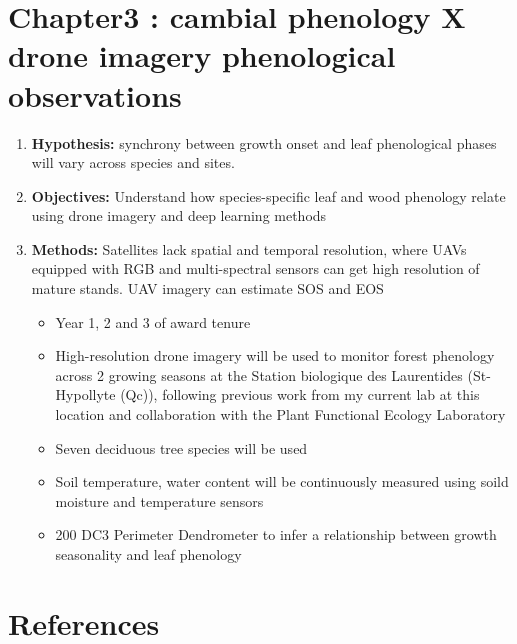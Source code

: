 \documentclass{article}
\begin{document}
\section*{Chapter3 : cambial phenology X drone imagery phenological observations}
\begin {enumerate}
	\item \textbf{Hypothesis:} synchrony between growth onset and leaf phenological phases will vary across species and sites.
	\item \textbf{Objectives:} Understand how species-specific leaf and wood phenology relate using drone imagery and deep learning methods  
	\item \textbf{Methods:} Satellites lack spatial and temporal resolution, where UAVs equipped with RGB and multi-spectral sensors can get high resolution of mature stands. UAV imagery can estimate SOS and EOS \citep{berra_assessing_2019,fawcett_monitoring_2021}
		\begin{itemize}
			\item Year 1, 2 and 3 of award tenure
			\item High-resolution drone imagery will be used to monitor forest phenology across 2 growing seasons at the Station biologique des Laurentides (St-Hypollyte (Qc)), following previous work from my current lab at this location and collaboration with the Plant Functional Ecology Laboratory
			\item Seven deciduous tree species will be used 
			\item Soil temperature, water content will be continuously measured using soild moisture and temperature sensors
			\item 200 DC3 Perimeter Dendrometer to infer a relationship between growth seasonality and leaf phenology
		\end{itemize}
\end {enumerate}

\section{References}

\end{document}
